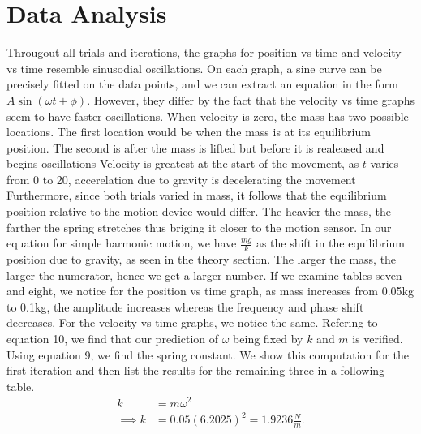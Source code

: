 \documentclass{report}
\begin{document}
    \section{Data Analysis}
    \bigbreak \noindent 
        Througout all trials and iterations, the graphs for position vs time and velocity vs time resemble sinusodial oscillations. On each graph, a sine curve can be precisely fitted on the data points, and we can extract an equation in the form $A\sin{\left(\omega t + \phi\right)}$. However, they differ by the fact that the velocity vs time graphs seem to have faster oscillations.  
        \bigbreak \noindent 
        When velocity is zero, the mass has two possible locations. The first location would be when the mass is at its equilibrium position. The second is after the mass is lifted but before it is realeased and begins oscillations
        \bigbreak \noindent 
        Velocity is greatest at the start of the movement, as $t$ varies from 0 to 20, accerelation due to gravity is decelerating the movement
        \bigbreak \noindent 
        Furthermore, since both trials varied in mass, it follows that the equilibrium position relative to the motion device would differ. The heavier the mass, the farther the spring stretches thus briging it closer to the motion sensor. In our equation for simple harmonic motion, we have $\frac{mg}{k}$ as the shift in the equilibrium position due to gravity, as seen in the theory section. The larger the mass, the larger the numerator, hence we get a larger number.
        \bigbreak \noindent 
        If we examine tables seven and eight, we notice for the position vs time graph, as mass increases from 0.05kg to 0.1kg, the amplitude increases whereas the frequency and phase shift decreases. For the velocity vs time graphs, we notice the same.
        \bigbreak \noindent 
        Refering to equation 10, we find that our prediction of $\omega$ being fixed by $k$ and $m$ is verified.
        \bigbreak \noindent 
        Using equation 9, we find the spring constant. We show this computation for the first iteration and then list the results for the remaining three in a following table.
        \bigbreak \noindent 
        \begin{align*}
            k &= m\omega^{2} \\
            \implies k &= 0.05(6.2025)^{2} = 1.9236 \frac{N}{m}
        .\end{align*}
\end{document}
